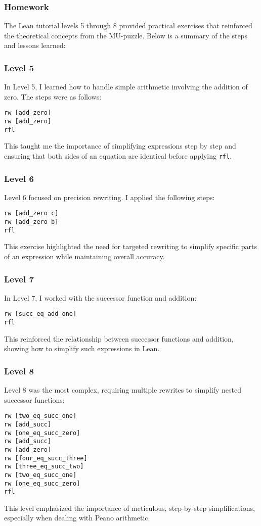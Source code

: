 \documentclass{article}
\theoremstyle{theorem}
\theoremstyle{definition}
\theoremstyle{remark}
\begin{document}
\subsubsection*{Homework}

The Lean tutorial levels 5 through 8 provided practical exercises that reinforced the theoretical concepts from the MU-puzzle. Below is a summary of the steps and lessons learned:

\subsubsection*{Level 5}
In Level 5, I learned how to handle simple arithmetic involving the addition of zero. The steps were as follows:
\begin{verbatim}
rw [add_zero]
rw [add_zero]
rfl
\end{verbatim}
This taught me the importance of simplifying expressions step by step and ensuring that both sides of an equation are identical before applying \texttt{rfl}.

\subsubsection*{Level 6}
Level 6 focused on precision rewriting. I applied the following steps:
\begin{verbatim}
rw [add_zero c]
rw [add_zero b]
rfl
\end{verbatim}
This exercise highlighted the need for targeted rewriting to simplify specific parts of an expression while maintaining overall accuracy.

\subsubsection*{Level 7}
In Level 7, I worked with the successor function and addition:
\begin{verbatim}
rw [succ_eq_add_one]
rfl
\end{verbatim}
This reinforced the relationship between successor functions and addition, showing how to simplify such expressions in Lean.

\subsubsection*{Level 8}
Level 8 was the most complex, requiring multiple rewrites to simplify nested successor functions:
\begin{verbatim}
rw [two_eq_succ_one]
rw [add_succ]
rw [one_eq_succ_zero]
rw [add_succ]
rw [add_zero]
rw [four_eq_succ_three]
rw [three_eq_succ_two]
rw [two_eq_succ_one]
rw [one_eq_succ_zero]
rfl
\end{verbatim}
This level emphasized the importance of meticulous, step-by-step simplifications, especially when dealing with Peano arithmetic.
\end{document}
